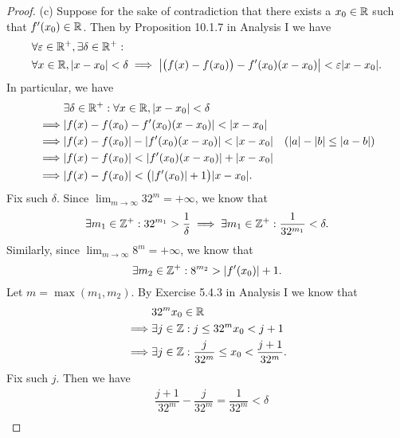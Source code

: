 \begin{proof}{(c)}
  Suppose for the sake of contradiction that there exists a \(x_0 \in \mathbb{R}\) such that \(f'(x_0) \in \mathbb{R}\).
  Then by Proposition 10.1.7 in Analysis I we have
  \begin{align*}
     & \forall \varepsilon \in \R^+, \exists \delta \in \R^+ :                                                                          \\
     & \forall x \in \R, \abs{x - x_0} < \delta \implies \abs{\big(f(x) - f(x_0)\big) - f'(x_0) (x - x_0)} < \varepsilon \abs{x - x_0}.
  \end{align*}
  In particular, we have
  \begin{align*}
             & \exists \delta \in \R^+ : \forall x \in \R, \abs{x - x_0} < \delta                                        \\
    \implies & \abs{f(x) - f(x_0) - f'(x_0) (x - x_0)} < \abs{x - x_0}                                                   \\
    \implies & \abs{f(x) - f(x_0)} - \abs{f'(x_0) (x - x_0)} < \abs{x - x_0}      & (\abs{a} - \abs{b} \leq \abs{a - b}) \\
    \implies & \abs{f(x) - f(x_0)} < \abs{f'(x_0) (x - x_0)} + \abs{x - x_0}                                             \\
    \implies & \abs{f(x) - f(x_0)} < \big(\abs{f'(x_0)} + 1\big) \abs{x - x_0}.
  \end{align*}
  Fix such \(\delta\).
  Since \(\lim_{m \to \infty} 32^m = +\infty\), we know that
  \[
    \exists m_1 \in \mathbb{Z}^+ : 32^{m_1} > \dfrac{1}{\delta} \implies \exists m_1 \in \mathbb{Z}^+ : \dfrac{1}{32^{m_1}} < \delta.
  \]
  Similarly, since \(\lim_{m \to \infty} 8^m = +\infty\), we know that
  \[
    \exists m_2 \in \mathbb{Z}^+ : 8^{m_2} > \left\lvert f'(x_0)\right\rvert + 1.
  \]
  Let \(m = \max(m_1, m_2)\).
  By Exercise 5.4.3 in Analysis I we know that
  \begin{align*}
             & 32^m x_0 \in \mathbb{R}                                                    \\
    \implies & \exists j \in \mathbb{Z} : j \leq 32^m x_0 < j + 1                         \\
    \implies & \exists j \in \mathbb{Z} : \dfrac{j}{32^m} \leq x_0 < \dfrac{j + 1}{32^m}.
  \end{align*}
  Fix such \(j\).
  Then we have
  \begin{align*}
             & \dfrac{j + 1}{32^m} - \dfrac{j}{32^m} = \dfrac{1}{32^m} < \delta                                                                                \\

\end{align*}
\end{proof}
